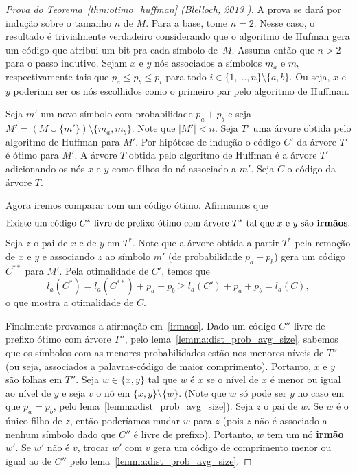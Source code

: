 \begin{proof}[Prova do Teorema~\ref{thm:otimo_huffman} (Blelloch, 2013 \cite{Ble})]
A prova se dará por indução sobre o tamanho $n$ de $M$. Para a base,
tome $n=2$. Nesse caso, o resultado é trivialmente verdadeiro
considerando que o algoritmo de Hufman gera um código que atribui um
bit pra cada símbolo de~$M$. Assuma então que $n>2$ para o passo
indutivo. Sejam $x$ e $y$ nós associados a símbolos $m_a$ e $m_b$
respectivamente tais que $p_a \leq p_b \leq p_i$ para todo $i \in
\{1,\dotsc,n\}\setminus\{a,b\}$. Ou seja, $x$ e $y$ poderiam ser os nós escolhidos como o primeiro par pelo algoritmo de Huffman.

Seja $m'$ um novo símbolo com probabilidade $p_a+p_b$ e seja $M' =
(M\cup\{m'\})\setminus\{m_a, m_b\}$. Note que $|M'| < n$. Seja $T'$
uma árvore obtida pelo algoritmo de Huffman para $M'$. Por hipótese de
indução o código $C'$ da árvore $T'$ é ótimo para $M'$. A árvore $T$
obtida pelo algoritmo de Huffman é a árvore $T'$ adicionando os nós
$x$ e $y$ como filhos do nó associado a $m'$. Seja $C$ o código da
árvore $T$.

Agora iremos comparar com um código ótimo. Afirmamos que
\begin{equation}
 \label{irmaos}
\text{Existe um código $C^*$ livre de prefixo ótimo com árvore $T^*$
  tal que $x$ e $y$ são \textbf{irmãos}.}
\end{equation}
Seja $z$ o pai de $x$ e de $y$ em $T^*$. Note que a árvore obtida a
partir $T^*$ pela remoção de $x$ e $y$ e associando $z$ ao símbolo
$m'$ (de probabilidade $p_a+p_b$) gera um código $C^{**}$ para $M'$. Pela
otimalidade de $C'$, temos que
\begin{equation*}
  l_a(C^*)
  =
   l_a(C^{**})+p_a+p_b
  \geq
  l_a(C')+p_a+p_b
  =
  l_a(C),
\end{equation*}
o que mostra a otimalidade de $C$.


Finalmente provamos a afirmação em~\eqref{irmaos}.  Dado um código
$C''$ livre de prefixo ótimo com árvore $T''$, pelo
lema~\ref{lemma:dist_prob_avg_size}, sabemos que os símbolos com as
menores probabilidades estão nos menores níveis de $T''$ (ou seja,
associados a palavras-código de maior comprimento). Portanto, $x$ e
$y$ são folhas em $T''$. Seja $w \in\{x,y\}$ tal que $w$ é $x$ se o
nível de $x$ é menor ou igual ao nível de $y$ e seja $v$ o nó em
$\{x,y\}\setminus\{w\}$. (Note que $w$ só pode ser $y$ no caso em que
$p_a = p_b$, pelo lema~\ref{lemma:dist_prob_avg_size}). Seja $z$ o pai
de $w$. Se $w$ é o único filho de $z$, então poderíamos mudar $w$ para
$z$ (pois $z$ não é associado a nenhum símbolo dado que $C''$ é livre
de prefixo). Portanto, $w$ tem um nó \textbf{irmão} $w'$. Se $w'$ não
é $v$, trocar $w'$ com $v$ gera um código de comprimento menor ou
igual ao de $C''$ pelo lema~\ref{lemma:dist_prob_avg_size}. 
\end{proof}



